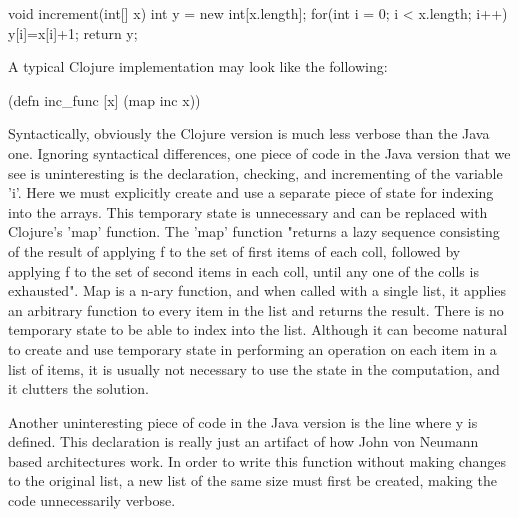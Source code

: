 void increment(int[] x) {
	int y = new int[x.length];
	for(int i = 0; i < x.length; i++) { 
	  y[i]=x[i]+1;
         }
         return y;
}

A typical Clojure implementation may look like the following: 

(defn inc_func [x] (map inc x))

Syntactically, obviously the Clojure version is much less verbose than the Java one.
Ignoring syntactical differences, one piece of code in the Java version that we see is uninteresting is the declaration,
checking, and incrementing of the variable 'i'. Here we must explicitly create and use a separate piece of state for indexing into the arrays. This temporary state is unnecessary
and can be replaced with Clojure's 'map' function. The 'map' function "returns a lazy sequence consisting of the result of applying f to the
set of first items of each coll, followed by applying f to the set
of second items in each coll, until any one of the colls is
exhausted". Map is a n-ary function, and when called with a single list, it applies an arbitrary function to every item in the list and returns the result. There is no 
temporary state to be able to index into the list. Although it can become natural to create and use temporary state in performing an operation on each item in a list of items,
it is usually not necessary to use the state in the computation, and it clutters the solution. 

Another uninteresting piece of code in the Java version is the line where y is defined. 
This declaration is really just an artifact of how John von Neumann based architectures work. In order to write this function without making changes to 
the original list, a new list of the same size must first be created, making the code unnecessarily verbose. 

